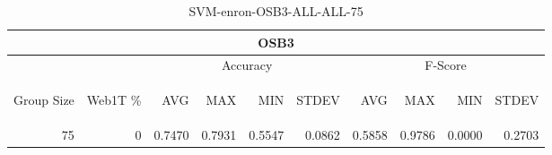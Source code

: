 \begin{center}
\begin{table}[htbp] 
 \begin{center}
\begin{tabular}{ | r | r | r | r | r | r | r | r | r | r |}
\hline
\multicolumn{10}{|c|}{OSB3}\\
\hline
 & & \multicolumn{4}{|c|}{Accuracy} & \multicolumn{4}{|c|}{F-Score}\\ \cline{3-10}
\begin{sideways}Group Size\end{sideways} & \begin{sideways}Web1T \%\end{sideways} & \begin{sideways}AVG\end{sideways} & \begin{sideways}MAX\end{sideways} & \begin{sideways}MIN\end{sideways} & \begin{sideways}STDEV\end{sideways} & \begin{sideways}AVG\end{sideways} & \begin{sideways}MAX\end{sideways} & \begin{sideways}MIN\end{sideways} & \begin{sideways}STDEV\end{sideways}\\
\hline
\multirow{0}{*}{75}
 & 0 & 0.7470 & 0.7931 & 0.5547 & 0.0862 & 0.5858 & 0.9786 & 0.0000 & 0.2703\\ \cline{2-10}
\hline
\end{tabular}
\caption{SVM-enron-OSB3-ALL-ALL-75}
\label{table:SVM-enron-OSB3-ALL-ALL-75}
\end{center}
 \end{table}
\end{center}


